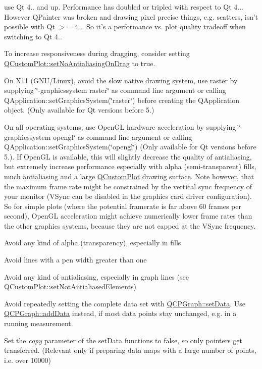 \begin{DoxyItemize}
\item use Qt 4.. and up. Performance has doubled or tripled with respect to Qt 4... However Q\-Painter was broken and drawing pixel precise things, e.\-g. scatters, isn't possible with Qt $>$= 4... So it's a performance vs. plot quality tradeoff when switching to Qt 4.. \item To increase responsiveness during dragging, consider setting \hyperlink{class_q_custom_plot_a775bdcb6329d44701aeaa6135b0e5265}{Q\-Custom\-Plot\-::set\-No\-Antialiasing\-On\-Drag} to true. \item On X11 (G\-N\-U/\-Linux), avoid the slow native drawing system, use raster by supplying \char`\"{}-\/graphicssystem raster\char`\"{} as command line argument or calling Q\-Application\-::set\-Graphics\-System(\char`\"{}raster\char`\"{}) before creating the Q\-Application object. (Only available for Qt versions before 5.) \item On all operating systems, use Open\-G\-L hardware acceleration by supplying \char`\"{}-\/graphicssystem
opengl\char`\"{} as command line argument or calling Q\-Application\-::set\-Graphics\-System(\char`\"{}opengl\char`\"{}) (Only available for Qt versions before 5.). If Open\-G\-L is available, this will slightly decrease the quality of antialiasing, but extremely increase performance especially with alpha (semi-\/transparent) fills, much antialiasing and a large \hyperlink{class_q_custom_plot}{Q\-Custom\-Plot} drawing surface. Note however, that the maximum frame rate might be constrained by the vertical sync frequency of your monitor (V\-Sync can be disabled in the graphics card driver configuration). So for simple plots (where the potential framerate is far above 60 frames per second), Open\-G\-L acceleration might achieve numerically lower frame rates than the other graphics systems, because they are not capped at the V\-Sync frequency. \item Avoid any kind of alpha (transparency), especially in fills \item Avoid lines with a pen width greater than one \item Avoid any kind of antialiasing, especially in graph lines (see \hyperlink{class_q_custom_plot_ae10d685b5eabea2999fb8775ca173c24}{Q\-Custom\-Plot\-::set\-Not\-Antialiased\-Elements}) \item Avoid repeatedly setting the complete data set with \hyperlink{class_q_c_p_graph_a1df2fd710545c8ba3b2c99a39a27bf8b}{Q\-C\-P\-Graph\-::set\-Data}. Use \hyperlink{class_q_c_p_graph_aa5c6181d84db72ce4dbe9dc15a34ef4f}{Q\-C\-P\-Graph\-::add\-Data} instead, if most data points stay unchanged, e.\-g. in a running measurement. \item Set the {\itshape copy} parameter of the set\-Data functions to false, so only pointers get transferred. (Relevant only if preparing data maps with a large number of points, i.\-e. over 10000)\end{DoxyItemize}
